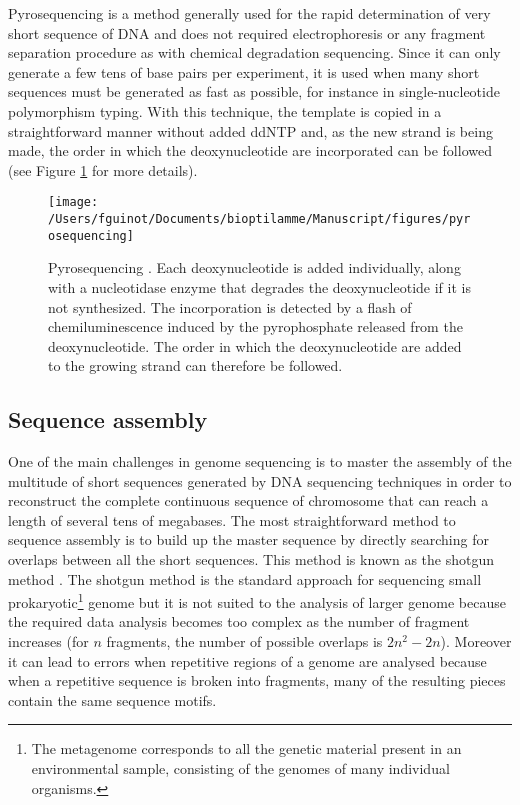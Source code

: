 \documentclass[]{book}
\let\rmarkdownfootnote\footnote%
\def\footnote{\protect\rmarkdownfootnote}
\begin{document}
Pyrosequencing is a method generally used for the rapid determination of
very short sequence of DNA and does not required electrophoresis or any
fragment separation procedure as with chemical degradation sequencing.
Since it can only generate a few tens of base pairs per experiment, it
is used when many short sequences must be generated as fast as possible,
for instance in single-nucleotide polymorphism typing. With this
technique, the template is copied in a straightforward manner without
added ddNTP and, as the new strand is being made, the order in which the
deoxynucleotide are incorporated can be followed (see Figure
\ref{fig:pyro} for more details).



\begin{figure}

{\centering \texttt{[image: /Users/fguinot/Documents/bioptilamme/Manuscript/figures/pyrosequencing]} 

}

\caption{Pyrosequencing \citep{brown2007genomes}. Each deoxynucleotide is added individually, along with a nucleotidase enzyme that degrades the deoxynucleotide if it is not synthesized. The incorporation is detected by a flash of chemiluminescence induced by the pyrophosphate released from the deoxynucleotide. The order in which the deoxynucleotide are added to the growing strand can therefore be followed.}\label{fig:pyro}
\end{figure}

\hypertarget{sequence-assembly}{%
\subsection{Sequence assembly}\label{sequence-assembly}}

One of the main challenges in genome sequencing is to master the
assembly of the multitude of short sequences generated by DNA sequencing
techniques in order to reconstruct the complete continuous sequence of
chromosome that can reach a length of several tens of megabases. The
most straightforward method to sequence assembly is to build up the
master sequence by directly searching for overlaps between all the short
sequences. This method is known as the shotgun method
\citep{anderson1981shotgun}. The shotgun method is the standard approach for
sequencing small prokaryotic\footnote{The metagenome corresponds to all the genetic material present in
  an environmental sample, consisting of the genomes of many
  individual organisms.} genome but it is not suited to the
analysis of larger genome because the required data analysis becomes too
complex as the number of fragment increases (for \(n\) fragments, the
number of possible overlaps is \(2n^2 - 2n\)). Moreover it can lead to
errors when repetitive regions of a genome are analysed because when a
repetitive sequence is broken into fragments, many of the resulting
pieces contain the same sequence motifs.
\end{document}
